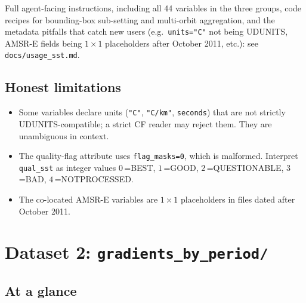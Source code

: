 \documentclass[11pt]{article}
\begin{document}
\noindent
Full agent-facing instructions, including all 44 variables in the
three groups, code recipes for bounding-box sub-setting and
multi-orbit aggregation, and the metadata pitfalls that catch
new users (e.g.\ \texttt{units="C"} not being UDUNITS, AMSR-E
fields being $1\times 1$ placeholders after October 2011, etc.):
see \texttt{docs/usage\_sst.md}.

\subsection{Honest limitations}

\begin{itemize}
  \item Some variables declare units (\texttt{"C"}, \texttt{"C/km"},
    \texttt{seconds}) that are not strictly UDUNITS-compatible; a
    strict CF reader may reject them. They are unambiguous in
    context.
  \item The quality-flag attribute uses \texttt{flag\_masks=0},
    which is malformed. Interpret \texttt{qual\_sst} as integer
    values $0$\,=BEST, $1$\,=GOOD, $2$\,=QUESTIONABLE, $3$\,=BAD,
    $4$\,=NOTPROCESSED.
  \item The co-located AMSR-E variables are $1\times 1$
    placeholders in files dated after October 2011.
\end{itemize}

\section{Dataset 2: \texttt{gradients\_by\_period/}}\label{sec:ds2}

\subsection{At a glance}
\end{document}
